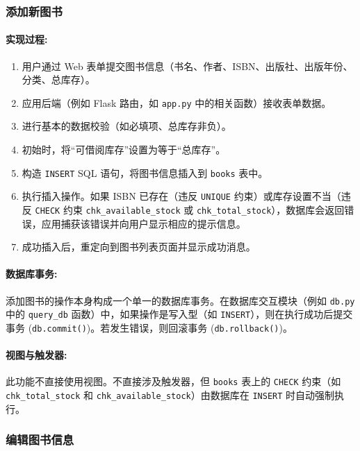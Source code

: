 \documentclass[11pt, a4paper]{article}
\begin{document}
\subsubsection{添加新图书}
\paragraph{实现过程:}
\begin{enumerate}
    \item 用户通过 Web 表单提交图书信息（书名、作者、ISBN、出版社、出版年份、分类、总库存）。
    \item 应用后端（例如 Flask 路由，如 \texttt{app.py} 中的相关函数）接收表单数据。
    \item 进行基本的数据校验（如必填项、总库存非负）。
    \item 初始时，将“可借阅库存”设置为等于“总库存”。
    \item 构造 \texttt{INSERT} SQL 语句，将图书信息插入到 \texttt{books} 表中。
    \item 执行插入操作。如果 ISBN 已存在（违反 \texttt{UNIQUE} 约束）或库存设置不当（违反 \texttt{CHECK} 约束 \texttt{chk\_available\_stock} 或 \texttt{chk\_total\_stock}），数据库会返回错误，应用捕获该错误并向用户显示相应的提示信息。
    \item 成功插入后，重定向到图书列表页面并显示成功消息。
\end{enumerate}
\paragraph{数据库事务:}
添加图书的操作本身构成一个单一的数据库事务。在数据库交互模块（例如 \texttt{db.py} 中的 \texttt{query\_db} 函数）中，如果操作是写入型（如 \texttt{INSERT}），则在执行成功后提交事务 (\texttt{db.commit()})。若发生错误，则回滚事务 (\texttt{db.rollback()})。
\paragraph{视图与触发器:}
此功能不直接使用视图。不直接涉及触发器，但 \texttt{books} 表上的 \texttt{CHECK} 约束（如 \texttt{chk\_total\_stock} 和 \texttt{chk\_available\_stock}）由数据库在 \texttt{INSERT} 时自动强制执行。

\subsubsection{编辑图书信息}
\end{document}
